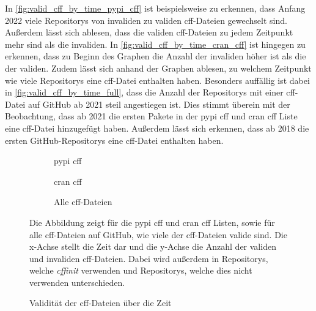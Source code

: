 In \autoref{fig:valid_cff_by_time_pypi_cff} ist beispielsweise zu erkennen, dass Anfang 2022 viele Repositorys von invaliden zu validen \gls{cff}-Dateien gewechselt sind.
Außerdem lässt sich ablesen, dass die validen \gls{cff}-Dateien zu jedem Zeitpunkt mehr sind als die invaliden.
In \autoref{fig:valid_cff_by_time_cran_cff} ist hingegen zu erkennen, dass zu Beginn des Graphen die Anzahl der invaliden höher ist als die der validen.
Zudem lässt sich anhand der Graphen ablesen, zu welchem Zeitpunkt wie viele Repositorys eine \gls{cff}-Datei enthalten haben.
Besonders auffällig ist dabei in \autoref{fig:valid_cff_by_time_full}, dass die Anzahl der Repositorys mit einer \gls{cff}-Datei auf GitHub ab 2021 steil angestiegen ist.
Dies stimmt überein mit der Beobachtung, dass ab 2021 die ersten Pakete in der \gls{pypi} \gls{cff} und \gls{cran} \gls{cff} Liste eine \gls{cff}-Datei hinzugefügt haben.
Außerdem lässt sich erkennen, dass ab 2018 die ersten GitHub-Repositorys eine \gls{cff}-Datei enthalten haben.

\begin{figure}
    \begin{subfigure}{.5\textwidth}
        \centering
        
        \caption{\gls{pypi} \gls{cff}}
        \label{fig:valid_cff_by_time_pypi_cff}
    \end{subfigure}%
    \begin{subfigure}{.5\textwidth}
        \centering
        
        \caption{\gls{cran} \gls{cff}}
        \label{fig:valid_cff_by_time_cran_cff}
    \end{subfigure}
    \begin{center}
        \begin{subfigure}{.5\textwidth}
            \centering
            
            \caption{Alle \gls{cff}-Dateien}
            \label{fig:valid_cff_by_time_full}
        \end{subfigure}
    \end{center}
    \caption{Validität der \gls{cff}-Dateien über die Zeit}
    \label{fig:valid_cff_by_time}
    \small
    Die Abbildung zeigt für die \gls{pypi} \gls{cff} und \gls{cran} \gls{cff} Listen, sowie für alle \gls{cff}-Dateien auf GitHub, wie viele der \gls{cff}-Dateien valide sind. Die x-Achse stellt die Zeit dar und die y-Achse die Anzahl der validen und invaliden \gls{cff}-Dateien. Dabei wird außerdem in Repositorys, welche \emph{cffinit} verwenden und Repositorys, welche dies nicht verwenden unterschieden.
\end{figure}

